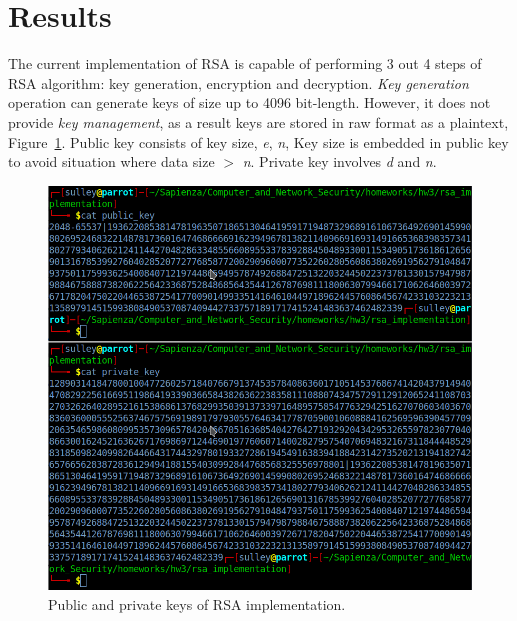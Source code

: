 \documentclass[11 pt]{article}
\begin{document}
\section{Results} 
The current implementation of RSA is capable of performing 3 out 4 steps of RSA algorithm: key generation, encryption and decryption. \textit{Key generation} operation can generate keys of size up to 4096 bit-length. However, it does not provide \textit{key management}, as a result keys are stored in raw format as a plaintext, Figure~\ref{fig:public-and-private-keys}. Public key consists of key size, \textit{e}, \textit{n}, Key size is embedded in public key to avoid situation where data size $>$  \textit{n}. Private key involves \textit{d} and \textit{n}.
\begin{figure}[H]
    \centering
    \includegraphics[width=1\linewidth]{rsa_implementation_keys.png}
    \caption{Public and private keys of RSA implementation.}
    \label{fig:public-and-private-keys}
\end{figure}
\end{document}
